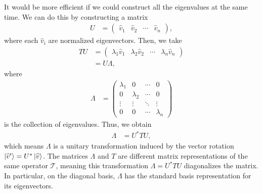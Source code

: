 \documentclass[10pt]{mypackage}
\begin{document}
It would be more efficient if we could construct all the eigenvalues at the same time. We can do this by constructing a matrix
\begin{align*}
  U &= \begin{pmatrix} \widehat{v}_1 & \widehat{v}_2 & \cdots & \widehat{v}_n\end{pmatrix},
\end{align*}
where each $\widehat{v}_i$ are normalized eigenvectors. Then, we take
\begin{align*}
  TU &= \begin{pmatrix}\lambda_1\widehat{v}_1 & \lambda_2\widehat{v}_2 & \cdots & \lambda_n\widehat{v}_n\end{pmatrix}\\
     &= U\Lambda,
\end{align*}
where
\begin{align*}
  \Lambda &= \begin{pmatrix}\lambda_1 & 0 & \cdots & 0 \\ 0 & \lambda_2 & \cdots & 0 \\ \vdots & \vdots & \ddots & \vdots \\ 0 & 0 & \cdots & \lambda_n\end{pmatrix}
\end{align*}
is the collection of eigenvalues. Thus, we obtain
\begin{align*}
  \Lambda &= U^{\ast}TU,
\end{align*}
which means $\Lambda$ is a unitary transformation induced by the vector rotation $\ket{\widehat{v}'} = U^{\ast}\ket{\widehat{v}}$. The matrices $\Lambda$ and $T$ are different matrix representations of the same operator $\mathcal{T}$, meaning this transformation $\Lambda = U^{\ast}TU$ diagonalizes the matrix. In particular, on the diagonal basis, $\Lambda$ has the standard basis representation for its eigenvectors.\newline
\end{document}
